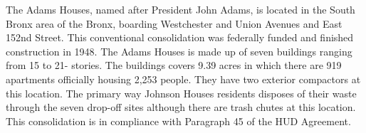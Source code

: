 

The Adams Houses, named after President John Adams,  is located in the South Bronx area of the Bronx, boarding Westchester and Union Avenues and East 152nd Street. This conventional consolidation was federally funded and finished construction in 1948. The Adams Houses is made up of seven buildings ranging from 15 to 21- stories.  The buildings covers 9.39 acres in which there are 919 apartments officially housing 2,253 people. They have two exterior compactors at this location. The primary way Johnson Houses residents disposes of their waste through the seven drop-off sites although there are trash chutes at this location. This consolidation is in compliance with Paragraph 45 of the HUD Agreement. 